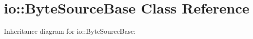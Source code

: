 \hypertarget{classio_1_1ByteSourceBase}{}\section{io\+:\+:Byte\+Source\+Base Class Reference}
\label{classio_1_1ByteSourceBase}


Inheritance diagram for io\+:\+:Byte\+Source\+Base\+:
